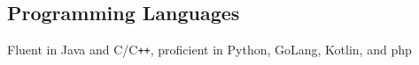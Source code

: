 \documentclass[../Resume.tex]{subfiles}
\begin{document}
	\subsection{Programming Languages}
	Fluent in Java and C/C\verb!++!, proficient in Python, GoLang, Kotlin, and php
	\vspace*{-4mm}
\end{document}
